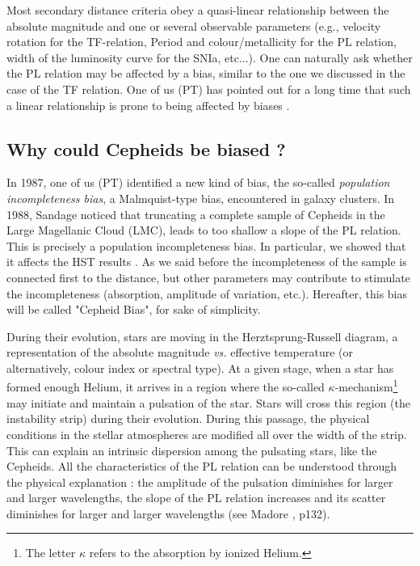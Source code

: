 Most secondary distance criteria obey a quasi-linear relationship between the absolute magnitude and one or several observable parameters (e.g., velocity rotation for the TF-relation, Period and colour/metallicity for the PL relation, width of the luminosity curve for the SNIa, etc...). One can naturally ask whether the PL relation may be affected by a bias, similar to the one we discussed in the case of the TF relation. One of us (PT) has pointed out for a long time that such a linear relationship is prone to being affected by biases \cite{pt84}.

\subsection{Why could Cepheids be biased ?  }
\label{sec3.1}
In 1987, one of us (PT) \cite{pt87} identified a new kind of bias, the so-called {\it{population incompleteness bias}}, a Malmquist-type bias, encountered in galaxy clusters. In 1988, Sandage \cite{as88} noticed that truncating a complete sample of Cepheids in the Large Magellanic Cloud (LMC),  leads to too shallow a slope of the PL relation.  This is precisely a population incompleteness bias. In particular, we showed that it affects the HST results \cite{Ref22}.
As we said before the incompleteness of the sample is connected first to the distance, but other parameters may contribute to stimulate the incompleteness (absorption, amplitude of variation, etc.). Hereafter, this bias will be called  "Cepheid Bias", for  sake of simplicity.

During their evolution, stars are moving in the Herztsprung-Russell diagram, a representation of the absolute magnitude {\it{vs.}} effective temperature (or alternatively, colour index or spectral type). At a given stage, when a star has formed enough Helium, it arrives in a region where the so-called $\kappa$-mechanism\footnote{The letter $\kappa$ refers to the absorption by ionized Helium. }
may initiate and maintain a pulsation of the star. Stars will cross this region (the instability strip)  during their evolution. During this passage, the physical conditions in the stellar atmospheres  are modified all over the width of the strip. This can explain an intrinsic dispersion among the pulsating stars, like the Cepheids. All the characteristics of the PL relation can be understood through the physical explanation : the amplitude of the pulsation diminishes for larger and larger wavelengths, the slope of the PL relation increases and its scatter diminishes for larger and larger wavelengths (see Madore \cite{madore1}, p132).


